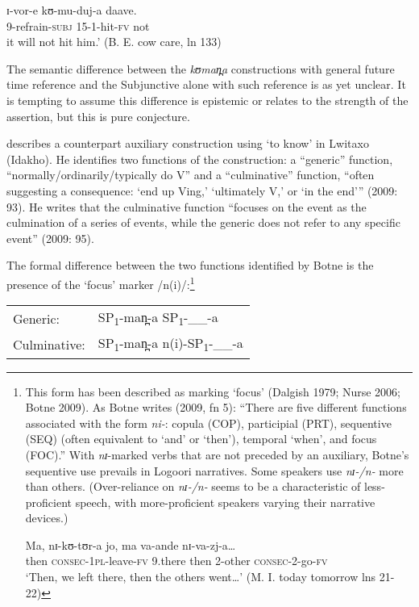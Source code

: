 \documentclass[output=paper]{langsci/langscibook}
\begin{document}
\gll ɪ{}-vor-e     kʊ-mu-duj-a   daave. \\
9-refrain-\textsc{subj}  15-1-hit-\textsc{fv}  not \\
\glt it will not hit him.’ (B. E. cow care, ln 133)
\z

The semantic difference between the \textit{kʊman̪a }constructions with general future time reference and the Subjunctive alone with such reference is as yet unclear. It is tempting to assume this difference is epistemic or relates to the strength of the assertion, but this is pure conjecture.

\citet{Botne2009} describes a counterpart auxiliary construction using ‘to know’ in Lwitaxo (Idakho). He identifies two functions of the construction: a “generic” function, “normally/ordinarily/typically do V” and a “culminative” function, “often suggesting a consequence: ‘end up Ving,’ ‘ultimately V,’ or ‘in the end’” (2009: 93). He writes that the culminative function “focuses on the event as the culmination of a series of events, while the generic does not refer to any specific event” (2009: 95).

The formal difference between the two functions identified by Botne is the presence of the ‘focus’ marker /n(i)/:\footnote{ This form has been described as marking ‘focus’ (Dalgish 1979; Nurse 2006; Botne 2009). As Botne writes (2009, fn 5): “There are five different functions associated with the form \textit{ni-}: copula (COP), participial (PRT), sequentive (SEQ) (often equivalent to ‘and’ or ‘then’), temporal ‘when’, and focus (FOC).” With \textit{nɪ}{}-marked verbs that are not preceded by an auxiliary, Botne’s sequentive use prevails in Logoori narratives. Some speakers use \textit{nɪ-/n- }more than others. (Over-reliance on \textit{nɪ-/n-} seems to be a characteristic of less-proficient speech, with more-proficient speakers varying their narrative devices.)  

\gll Ma,   nɪ-kʊ-tʊr-a     jo,  ma   va-ande     nɪ-va-zj-a…  \\
then  \textsc{consec}{}-\textsc{1pl-}leave-\textsc{fv}  9.there  then  2-other    \textsc{consec}{}-2-go-\textsc{fv}\\

‘Then, we left there, then the others went…’ (M. I. today tomorrow lns 21-22)}

\begin{tabular}{ll}
Generic:  & SP\textsubscript{1}{}-man̪-a   SP\textsubscript{1}{}-\_\_-a \\
Culminative:  & SP\textsubscript{1}{}-man̪-a  n(i)-SP\textsubscript{1}{}-\_\_-a
\end{tabular}
\end{document}
